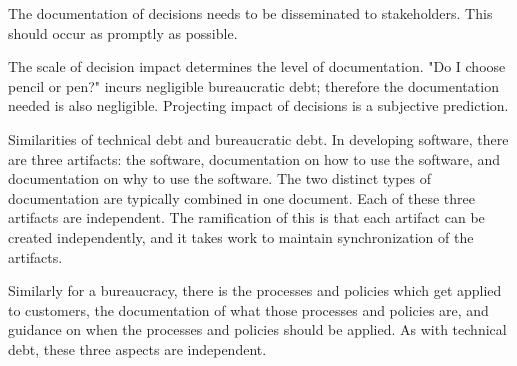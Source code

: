 The documentation of decisions needs to be disseminated to stakeholders. This should occur as promptly as possible. 

The scale of decision impact determines the level of documentation. "Do I choose pencil or pen?" incurs negligible bureaucratic debt; therefore the documentation needed is also negligible. Projecting impact of decisions is a subjective prediction. 

Similarities of technical debt and bureaucratic debt.
In developing software, there are three artifacts: the software, documentation on how to use the software, and documentation on why to use the software. The two distinct types of documentation are typically combined in one document. Each of these three artifacts are independent. The ramification of this is that each artifact can be created independently, and it takes work to maintain synchronization of the artifacts. 

Similarly for a bureaucracy, there is the processes and policies which get applied to customers, the documentation of what those processes and policies are, and guidance on when the processes and policies should be applied. As with technical debt, these three aspects are independent. 
